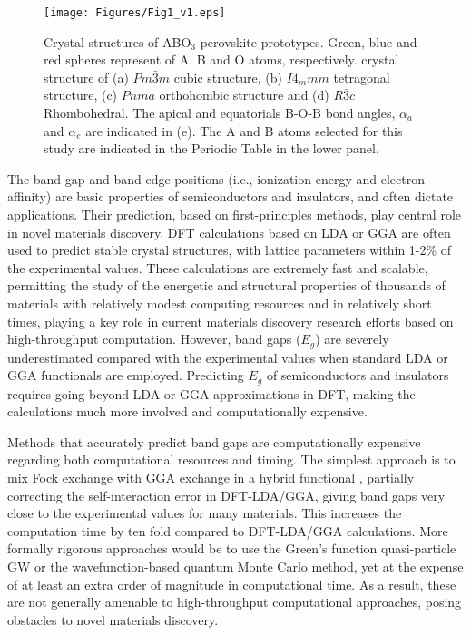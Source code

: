 \documentclass[%
reprint,
superscriptaddress,
citeautoscript,
 amsmath,amssymb,
 aps,
 prl,
floatfix,
]{revtex4-1}
\begin{document}
 \begin{figure}[ht]
\begin{center}
\texttt{[image: Figures/Fig1\_v1.eps]}
\end{center}
\caption{Crystal structures of ABO$_3$ perovskite prototypes. Green, blue and red spheres represent of A, B and O atoms, respectively.  crystal structure of (a) $Pm\bar{3}m$ cubic structure, (b) $I4_mmm$ tetragonal structure, (c)  $Pnma$ orthohombic structure and (d) $R\bar{3}c$ Rhombohedral. The apical and equatorials B-O-B bond angles, $\alpha_{a}$ and $\alpha_{e}$ are indicated in (e). The A and B atoms selected for this study are indicated in the Periodic Table in the lower panel.
}
\label{fig1}
\end{figure}

The band gap and band-edge positions (i.e., ionization energy and electron affinity) are basic properties of semiconductors and insulators, and often dictate applications. Their prediction, based on first-principles methods, play central role in novel materials discovery. DFT calculations \cite{Kohn1964,Kohn1965} based on LDA\cite{Hohenberg1964} or GGA\cite{Perdew1996} are often used to predict stable crystal structures, with lattice parameters within 1-2\% of the experimental values\cite{Tran2016,Lianhua2014}. These calculations are extremely fast and scalable, permitting the study of the energetic and structural properties of thousands of materials with relatively modest computing resources and in relatively short times, playing a key role in current materials discovery research efforts based on high-throughput computation. However, band gaps ($E_g$) are severely underestimated compared with the experimental values when standard LDA or GGA functionals are employed. Predicting $E_g$ of semiconductors and insulators requires going beyond LDA or GGA approximations in DFT, making the calculations much more involved and computationally expensive.

Methods that accurately predict band gaps are computationally expensive regarding both computational resources and timing. The simplest approach is to mix Fock exchange with GGA exchange in a hybrid functional \cite{Becke1993,Perdew1996_1,Heyd2003,Heyd2006}, partially correcting the self-interaction error in DFT-LDA/GGA, giving band gaps very close to the experimental values for many materials\cite{Brothers2008,Xiao2011,Kim2009,Henderson2011}. This increases the computation time by ten fold compared to DFT-LDA/GGA calculations. More formally rigorous approaches would be to use the Green’s function quasi-particle GW \cite{Luoie1996,Kresse2006,Chen2015} or the wavefunction-based quantum Monte Carlo\cite{Hunt2018,Yang2020,Hunt2020} method, yet at the expense of at least an extra order of magnitude in computational time. As a result, these are not generally amenable to high-throughput computational approaches, posing obstacles to novel materials discovery. 
\end{document}
